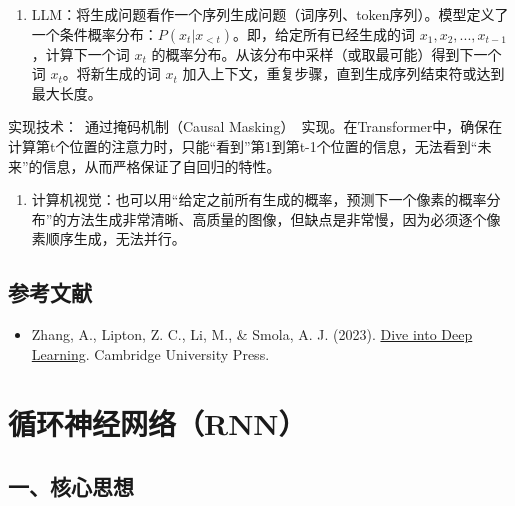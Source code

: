 \begin{enumerate}
\def\labelenumi{\arabic{enumi}.}
\tightlist
\item
  LLM：将生成问题看作一个序列生成问题（词序列、token序列）。模型定义了一个条件概率分布：\(P(x_t | x_{<t})\)。即，给定所有已经生成的词 \(x_1, x_2, ..., x_{t-1}\)，计算下一个词 \(x_t\) 的概率分布。从该分布中采样（或取最可能）得到下一个词 \(x_t\)。将新生成的词 \(x_t\) 加入上下文，重复步骤，直到生成序列结束符或达到最大长度。
\end{enumerate}

实现技术：~通过掩码机制（Causal Masking）~实现。在Transformer中，确保在计算第t个位置的注意力时，只能``看到''第1到第t-1个位置的信息，无法看到``未来''的信息，从而严格保证了自回归的特性。

\begin{enumerate}
\def\labelenumi{\arabic{enumi}.}
\setcounter{enumi}{1}
\tightlist
\item
  计算机视觉：也可以用``给定之前所有生成的概率，预测下一个像素的概率分布''的方法生成非常清晰、高质量的图像，但缺点是非常慢，因为必须逐个像素顺序生成，无法并行。
\end{enumerate}

\hypertarget{ux53c2ux8003ux6587ux732e-17}{%
\subsection{参考文献}\label{ux53c2ux8003ux6587ux732e-17}}

\vspace{0.25em}
\begin{itemize}
\tightlist
\item
  Zhang, A., Lipton, Z. C., Li, M., \& Smola, A. J. (2023). \href{https://D2L.ai}{Dive into Deep Learning}. Cambridge University Press.
\end{itemize}

\clearpage

\hypertarget{ux5faaux73afux795eux7ecfux7f51ux7edcrnn}{%
\section{循环神经网络（RNN）}\label{ux5faaux73afux795eux7ecfux7f51ux7edcrnn}}

\hypertarget{ux4e00ux6838ux5fc3ux601dux60f3-1}{%
\subsection{一、核心思想}\label{ux4e00ux6838ux5fc3ux601dux60f3-1}}

